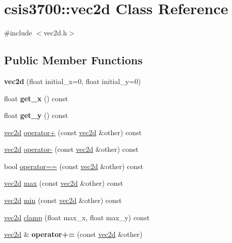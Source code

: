 \hypertarget{classcsis3700_1_1vec2d}{\section{csis3700\-:\-:vec2d Class Reference}
\label{classcsis3700_1_1vec2d}
}


{\ttfamily \#include $<$vec2d.\-h$>$}

\subsection*{Public Member Functions}
\begin{DoxyCompactItemize}
\item 
\hypertarget{classcsis3700_1_1vec2d_a40ee61b39f4e735dc12bd6030036c276}{{\bfseries vec2d} (float initial\-\_\-x=0, float initial\-\_\-y=0)}\label{classcsis3700_1_1vec2d_a40ee61b39f4e735dc12bd6030036c276}

\item 
\hypertarget{classcsis3700_1_1vec2d_ad99d90c512540cb22df3a34b6c748390}{float {\bfseries get\-\_\-x} () const }\label{classcsis3700_1_1vec2d_ad99d90c512540cb22df3a34b6c748390}

\item 
\hypertarget{classcsis3700_1_1vec2d_a238c5e6574ffa9a040733fd870542ff9}{float {\bfseries get\-\_\-y} () const }\label{classcsis3700_1_1vec2d_a238c5e6574ffa9a040733fd870542ff9}

\item 
\hyperlink{classcsis3700_1_1vec2d}{vec2d} \hyperlink{classcsis3700_1_1vec2d_a67675c0b80feaae1bde4be1153e71afb}{operator+} (const \hyperlink{classcsis3700_1_1vec2d}{vec2d} \&other) const 
\item 
\hyperlink{classcsis3700_1_1vec2d}{vec2d} \hyperlink{classcsis3700_1_1vec2d_a82b66d3d0e33548a49edb086a83c51ee}{operator-\/} (const \hyperlink{classcsis3700_1_1vec2d}{vec2d} \&other) const 
\item 
bool \hyperlink{classcsis3700_1_1vec2d_a8646bbf0141b775f1ff879ddc88f7032}{operator==} (const \hyperlink{classcsis3700_1_1vec2d}{vec2d} \&other) const 
\item 
\hyperlink{classcsis3700_1_1vec2d}{vec2d} \hyperlink{classcsis3700_1_1vec2d_a96895ad421dc29e595002a38cbd9db63}{max} (const \hyperlink{classcsis3700_1_1vec2d}{vec2d} \&other) const 
\item 
\hyperlink{classcsis3700_1_1vec2d}{vec2d} \hyperlink{classcsis3700_1_1vec2d_a88c04b0f27409ab448ded728b49ac976}{min} (const \hyperlink{classcsis3700_1_1vec2d}{vec2d} \&other) const 
\item 
\hyperlink{classcsis3700_1_1vec2d}{vec2d} \hyperlink{classcsis3700_1_1vec2d_ae79813cf256462512ddd3b293e074b05}{clamp} (float max\-\_\-x, float max\-\_\-y) const 
\item 
\hypertarget{classcsis3700_1_1vec2d_a2dc8b8021ffeed353db058f4815c8c24}{\hyperlink{classcsis3700_1_1vec2d}{vec2d} \& {\bfseries operator+=} (const \hyperlink{classcsis3700_1_1vec2d}{vec2d} \&other)}\label{classcsis3700_1_1vec2d_a2dc8b8021ffeed353db058f4815c8c24}

\end{DoxyCompactItemize}


